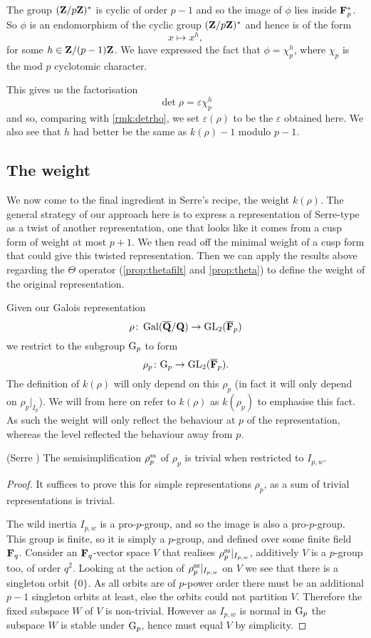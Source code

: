 \documentclass[a4paper,12pt]{article}
\begin{document}
The group $(\mathbf{Z}/p\mathbf{Z})^*$ is cyclic of order $p-1$ and so the image of $\phi$ lies inside $\mathbf{F}_p^*$.
So $\phi$ is an endomorphism of the cyclic group $(\mathbf{Z}/p\mathbf{Z})^*$ and hence is of the form
\[
x \mapsto x^h,
\]
for some $h \in \mathbf{Z}/(p-1)\mathbf{Z}$.
We have expressed the fact that $\phi = \chi_p^h$, where $\chi_p$ is the mod $p$ cyclotomic character.

This gives us the factorisation
\[
\det\rho = \varepsilon \chi_p^h
\]
and so, comparing with \cref{rmk:detrho}, we set $\varepsilon(\rho)$ to be the $\varepsilon$ obtained here.
We also see that $h$ had better be the same as $k(\rho)-1$ modulo $p-1$.



\subsection{The weight}
We now come to the final ingredient in Serre's recipe, the weight $k(\rho)$.
The general strategy of our approach here is to express a representation of Serre-type as a twist of another representation, one that looks like it comes from a cusp form of weight at most $p+1$.
We then read off the minimal weight of a cusp form that could give this twisted representation.
Then we can apply the results above regarding the $\Theta$ operator (\cref{prop:thetafilt} and \cref{prop:theta}) to define the weight of the original representation.

Given our Galois representation
\[
\rho \colon \operatorname{Gal}(\overline{\mathbf{Q}}/\mathbf{Q}) \to \operatorname{GL}_2(\overline{\mathbf{F}}_p)
\]
we restrict to the subgroup $\mathrm{G}_p$ to form
\[
\rho_p\colon \mathrm{G}_p \to \operatorname{GL}_2(\overline{\mathbf{F}}_p).
\]
The definition of $k(\rho)$ will only depend on this $\rho_p$ (in fact it will only depend on $\rho_p|_{I_p}$).
We will from here on refer to $k(\rho)$ as $k(\rho_p)$ to emphasise this fact.
As such the weight will only reflect the behaviour at $p$ of the representation, whereas the level reflected the behaviour away from $p$.

\begin{prop}(Serre \cite[prop. 4]{Serre72})\label{prop:wildtriv}
The semisimplification $\rho^\text{ss}_p$ of $\rho_p$ is trivial when restricted to $I_{p,w}$.
\end{prop}
\begin{proof}
It suffices to prove this for simple representations $\rho_p$, as a sum of trivial representations is trivial.

The wild inertia $I_{p,w}$ is a pro-$p$-group, and so the image is also a pro-$p$-group.
This group is finite, so it is simply a $p$-group, and defined over some finite field $\mathbf{F}_q$.
Consider an $\mathbf{F}_q$-vector space $V$ that realises $\rho^\text{ss}_p|_{I_{p,w}}$,  additively $V$ is a $p$-group too, of order $q^2$.
Looking at the action of $\rho^\text{ss}_p|_{I_{p,w}}$ on $V$ we see that there is a singleton orbit $\{0\}$.
As all orbits are of $p$-power order there must be an additional $p-1$ singleton orbits at least, else the orbits could not partition $V$.
Therefore the fixed subspace $W$ of $V$ is non-trivial.
However as $I_{p,w}$ is normal in $\mathrm{G}_p$ the subspace $W$ is stable under $\mathrm{G}_p$, hence must equal $V$ by simplicity.
\end{proof}
\end{document}
